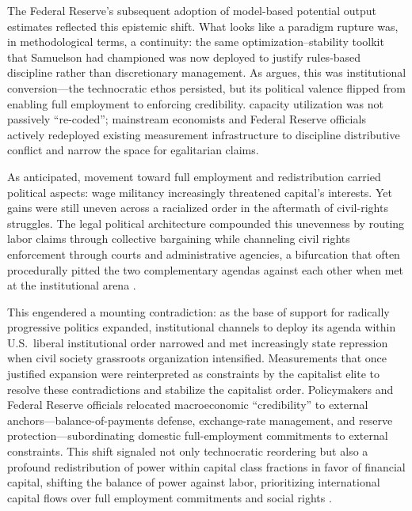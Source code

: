 \documentclass[11pt]{article}
\begin{document}
The Federal Reserve's subsequent adoption of model-based potential output estimates \citep{usgao1996} reflected this epistemic shift. What looks like a paradigm rupture was, in methodological terms, a continuity: the same optimization--stability toolkit that Samuelson had championed \citep{samuelson1947} was now deployed to justify rules-based discipline rather than discretionary management. As \citet{johnson2024} argues, this was institutional conversion---the technocratic ethos persisted, but its political valence flipped from enabling full employment to enforcing credibility. capacity utilization was not passively ``re-coded''; mainstream economists and Federal Reserve officials actively redeployed existing measurement infrastructure to discipline distributive conflict and narrow the space for egalitarian claims.

As \citet{kalecki1943} anticipated, movement toward full employment and redistribution carried political aspects: wage militancy increasingly threatened capital's interests. Yet gains were still uneven across a racialized order in the aftermath of civil-rights struggles. The legal political architecture compounded this unevenness by routing labor claims through collective bargaining while channeling civil rights enforcement through courts and administrative agencies, a bifurcation that often procedurally pitted the two complementary agendas against each other when met at the institutional arena \citep{schiller2015}.

This engendered a mounting contradiction: as the base of support for radically progressive politics expanded, institutional channels to deploy its agenda within U.S.\ liberal institutional order narrowed and met increasingly state repression when civil society grassroots organization intensified. Measurements that once justified expansion were reinterpreted as constraints by the capitalist elite to resolve these contradictions and stabilize the capitalist order. Policymakers and Federal Reserve officials relocated macroeconomic ``credibility'' to external anchors---balance-of-payments defense, exchange-rate management, and reserve protection---subordinating domestic full-employment commitments to external constraints. This shift signaled not only technocratic reordering but also a profound redistribution of power within capital class fractions in favor of financial capital, shifting the balance of power against labor, prioritizing international capital flows over full employment commitments and social rights \citep{vernengo2021}.
\end{document}
